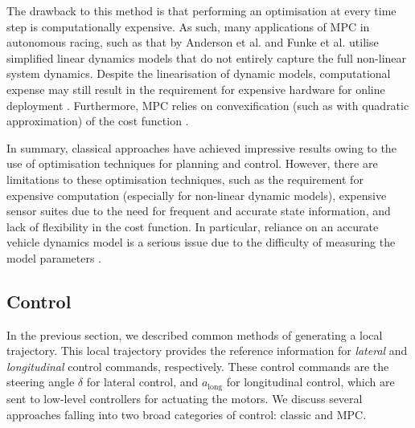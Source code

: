 The drawback to this method is that performing an optimisation at every time step is computationally expensive.
As such, many applications of MPC in autonomous racing, such as that by  Anderson et al. \cite{Anderson2016} and Funke et al. \cite{Funke2017} utilise simplified linear dynamics models that do not entirely capture the full non-linear system dynamics.
Despite the linearisation of dynamic models, computational expense may still result in the requirement for expensive hardware for online deployment \cite{Pan2017a}.
Furthermore, MPC relies on convexification (such as with quadratic approximation) of the cost function \cite{Williams2017}.

In summary, classical approaches have achieved impressive results owing to the use of optimisation techniques for planning and control. 
However, there are limitations to these optimisation techniques, such as the requirement for expensive computation (especially for non-linear dynamic models), expensive sensor suites due to the need for frequent and accurate state information, and lack of flexibility in the cost function. 
In particular, reliance on an accurate vehicle dynamics model is a serious issue due to the difficulty of measuring the model parameters \cite{Kabzan2019, Pan2017}.







\subsection{Control}
\label{sec:control}

In the previous section, we described common methods of generating a local trajectory.
This local trajectory provides the reference information for \emph{lateral} and \emph{longitudinal} control commands, respectively.
These control commands are the steering angle $\delta$ for lateral control, and $a_{\text{long}}$ for longitudinal control, which are sent to low-level controllers for actuating the motors. 
We discuss several approaches falling into two broad categories of control: classic and MPC.

